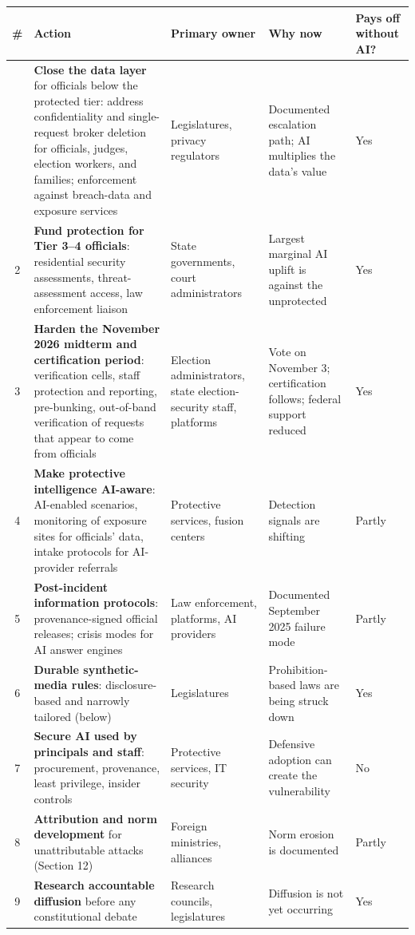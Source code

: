\documentclass[11pt,letterpaper]{article}
\begin{document}
{\footnotesize
\begin{longtable}{cL{5.6cm}L{3.2cm}L{3.3cm}L{1.6cm}}
\toprule
\textbf{\#} & \textbf{Action} & \textbf{Primary owner} & \textbf{Why now} & \textbf{Pays off without AI?} \\
\midrule
\endhead
\bottomrule
{} & \textbf{Close the data layer} for officials below the protected tier: address confidentiality and single-request broker deletion for officials, judges, election workers, and families; enforcement against breach-data and exposure services & Legislatures, privacy regulators & Documented escalation path; AI multiplies the data's value & Yes \\
2 & \textbf{Fund protection for Tier 3--4 officials}: residential security assessments, threat-assessment access, law enforcement liaison & State governments, court administrators & Largest marginal AI uplift is against the unprotected & Yes \\
3 & \textbf{Harden the November 2026 midterm and certification period}: verification cells, staff protection and reporting, pre-bunking, out-of-band verification of requests that appear to come from officials & Election administrators, state election-security staff, platforms & Vote on November 3; certification follows; federal support reduced & Yes \\
4 & \textbf{Make protective intelligence AI-aware}: AI-enabled scenarios, monitoring of exposure sites for officials' data, intake protocols for AI-provider referrals & Protective services, fusion centers & Detection signals are shifting & Partly \\
5 & \textbf{Post-incident information protocols}: provenance-signed official releases; crisis modes for AI answer engines & Law enforcement, platforms, AI providers & Documented September 2025 failure mode & Partly \\
6 & \textbf{Durable synthetic-media rules}: disclosure-based and narrowly tailored (below) & Legislatures & Prohibition-based laws are being struck down & Yes \\
7 & \textbf{Secure AI used by principals and staff}: procurement, provenance, least privilege, insider controls & Protective services, IT security & Defensive adoption can create the vulnerability & No \\
8 & \textbf{Attribution and norm development} for unattributable attacks (Section 12) & Foreign ministries, alliances & Norm erosion is documented & Partly \\
9 & \textbf{Research accountable diffusion} before any constitutional debate & Research councils, legislatures & Diffusion is not yet occurring & Yes \\
\end{longtable}}
\end{document}

